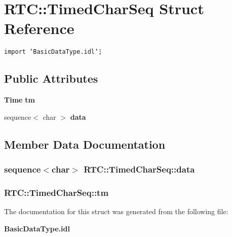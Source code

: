 \section{RTC::Timed\-Char\-Seq Struct Reference}
\label{structRTC_1_1TimedCharSeq}
{\tt import \char`\"{}Basic\-Data\-Type.idl\char`\"{};}

\subsection*{Public Attributes}
\begin{CompactItemize}
\item 
{\bf Time} {\bf tm}
\item 
sequence$<$ char $>$ {\bf data}
\end{CompactItemize}


\subsection{Member Data Documentation}
\subsubsection{\setlength{\rightskip}{0pt plus 5cm}sequence$<$char$>$ {\bf RTC::Timed\-Char\-Seq::data}}\label{structRTC_1_1TimedCharSeq_RTC_1_1TimedCharSeqo1}


\subsubsection{ {\bf RTC::Timed\-Char\-Seq::tm}}\label{structRTC_1_1TimedCharSeq_RTC_1_1TimedCharSeqo0}




The documentation for this struct was generated from the following file:\begin{CompactItemize}
\item 
{\bf Basic\-Data\-Type.idl}\end{CompactItemize}
